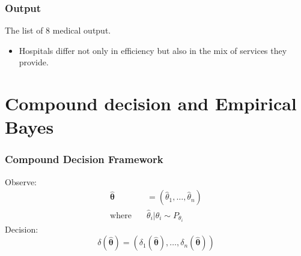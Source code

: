 \documentclass[10pt,mathserif,aspectratio=169]{beamer}
\begin{document}
\begin{frame}[label=output]
  \frametitle{Output}
  The list of 8 medical output.
  \begin{table}
    \begin{adjustbox}{width=0.9\textwidth,center}
      \centering
      
    \end{adjustbox}
  \end{table}
  \begin{itemize}\itemsep = 8pt
    \item Hospitals differ not only in efficiency but also in the mix of services they
          provide.

  \end{itemize}

\end{frame}

\section{Compound decision and Empirical Bayes}

\begin{frame}
  \frametitle{Compound Decision Framework}
  Observe:
  \begin{align*}
    \boldsymbol{\hat{\theta}} & =  (\hat{\theta}_1,\ldots, \hat{\theta}_n)  \\
    \text{where} \quad        & \hat{\theta}_i | \theta_i \sim P_{\theta_i}
  \end{align*}
  Decision:
  \begin{equation*}
    \delta(\boldsymbol{\hat{\theta}}) = (\delta_1(\boldsymbol{\hat{\theta}}), \ldots, \delta_n(\boldsymbol{\hat{\theta}}))
  \end{equation*}
\end{frame}
\end{document}
